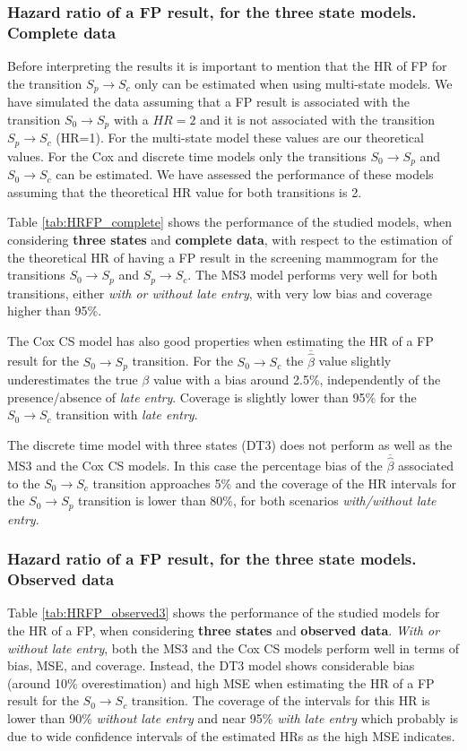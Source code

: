 \documentclass{bmcart}
\begin{document}
\subsubsection*{Hazard ratio of a FP result, for the three state models. Complete data}
Before interpreting the results it is important to mention that the HR of FP for the transition
$S_p \rightarrow S_c$ only can be estimated when using multi-state models. We have simulated the
data assuming that a FP result is associated with the transition $S_0 \rightarrow S_p$ with a
$HR = 2$ and it is not associated with the transition $S_p \rightarrow S_c$ (HR=1). For the
multi-state model these values are our theoretical values. For the Cox and discrete time models only
the transitions $S_0 \rightarrow S_p$ and $S_0 \rightarrow S_c$ can be estimated. We have assessed
the performance of these models assuming that the theoretical HR value for both transitions is 2.

Table \ref{tab:HRFP_complete} shows the performance of the studied models, when considering
\textbf{three states} and \textbf{complete data}, with respect to the estimation of the theoretical
HR of having a FP result in the screening mammogram for the transitions $S_0 \rightarrow S_p$ and
$S_p \rightarrow S_c$. The MS3 model performs very well for both transitions, either \textit{with
or without late entry}, with very low bias and coverage higher than 95\%.

The Cox CS model has also good properties when estimating the HR of a FP result for the
$S_0 \rightarrow S_p$ transition. For the $S_0 \rightarrow S_c$ the $\overline{\hat\beta}$ value
slightly underestimates the true $\beta$ value with a bias around 2.5\%, independently of the
presence/absence of \textit{late entry}. Coverage is slightly lower than 95\% for the
$S_0 \rightarrow S_c$ transition with \textit{late entry}.

The discrete time model with three states (DT3) does not perform as well as the MS3 and the Cox CS
models. In this case the percentage bias of the $\overline{\hat\beta}$ associated to the
$S_0 \rightarrow S_c$ transition approaches 5\% and the coverage of the HR intervals for the
$S_0 \rightarrow S_p$ transition is lower than 80\%, for both scenarios \textit{with/without late
entry}.

\subsubsection*{Hazard ratio of a FP result, for the three state models. Observed data}
Table \ref{tab:HRFP_observed3} shows the performance of the studied models for the HR of a FP, when
considering \textbf{three states} and \textbf{observed data}. \textit{With or without late entry},
both the MS3 and the Cox CS models perform well in terms of bias, MSE, and coverage. Instead, the
DT3 model shows considerable bias (around 10\% overestimation) and high MSE when estimating the HR
of a FP result for the $S_0 \rightarrow S_c$ transition. The coverage of the intervals for this HR
is lower than 90\% \textit{without late entry} and near 95\% \textit{with late entry} which
probably is due to wide confidence intervals of the estimated HRs as the high MSE indicates.
\end{document}
